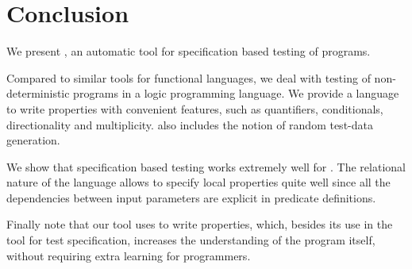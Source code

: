 
\section{Conclusion}
\label{sec:conclusion}


We present \plqc{}, an automatic tool for specification based
testing of \Prolog{} programs.


Compared to similar tools for functional languages, we deal with testing
of non-deterministic programs in a logic programming language.
%
We provide a language to write properties with convenient features,
such as quantifiers, conditionals, directionality and multiplicity.
%
\plqc{} also includes the notion of random test-data generation.


We show that specification based testing works extremely well for
\Prolog.
%
The relational nature of the language allows to specify local properties
quite well since all the dependencies between input parameters are explicit in
predicate definitions.


Finally note that our tool uses \Prolog{} to write properties, which,
besides its use in the tool for test specification, increases the
understanding of the program itself, without requiring extra learning for
\Prolog{} programmers.
